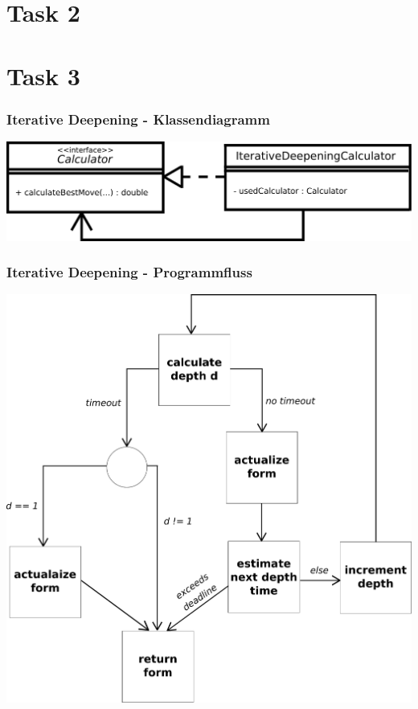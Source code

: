 \documentclass{beamer}
\begin{document}
\section{Task 2}

\begin{frame}

\end{frame}

\section{Task 3}

\begin{frame}
\centering
\frametitle{Iterative Deepening - Klassendiagramm}
\includegraphics[scale=0.25]{deepener-classdiagram}
\end{frame}

\begin{frame}
\centering
\frametitle{Iterative Deepening - Programmfluss}
\includegraphics[scale=0.17]{deepener-flow-chart}
\end{frame}
\end{document}
